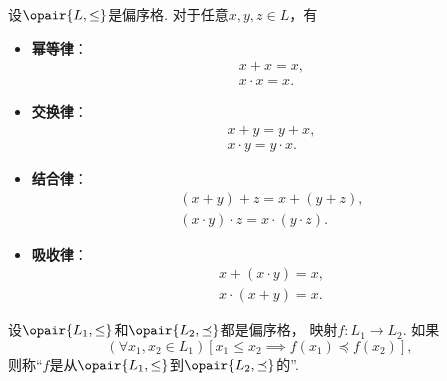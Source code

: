 \begin{theorem}
设\(\opair{L,\leq}\)是偏序格.
对于任意\(x,y,z \in L\)，有\begin{itemize}
	\item {\rm\bf 幂等律}：\begin{gather*}
		x + x = x, \\
		x \cdot x = x.
	\end{gather*}

	\item {\rm\bf 交换律}：\begin{gather*}
		x + y = y + x, \\
		x \cdot y = y \cdot x.
	\end{gather*}

	\item {\rm\bf 结合律}：\begin{gather*}
		(x + y) + z = x + (y + z), \\
		(x \cdot y) \cdot z = x \cdot (y \cdot z).
	\end{gather*}

	\item {\rm\bf 吸收律}：\begin{gather*}
		x + (x \cdot y) = x, \\
		x \cdot (x + y) = x.
	\end{gather*}
\end{itemize}
\end{theorem}

\begin{definition}
设\(\opair{L_1,\leq}\)和\(\opair{L_2,\preceq}\)都是偏序格，
映射\(f\colon L_1 \to L_2\).
如果\begin{equation*}
	(\forall x_1,x_2 \in L_1)
	[
		x_1 \leq x_2
		\implies
		f(x_1) \preceq f(x_2)
	],
\end{equation*}
则称“\(f\)是从\(\opair{L_1,\leq}\)到\(\opair{L_2,\preceq}\)的”.
\end{definition}
